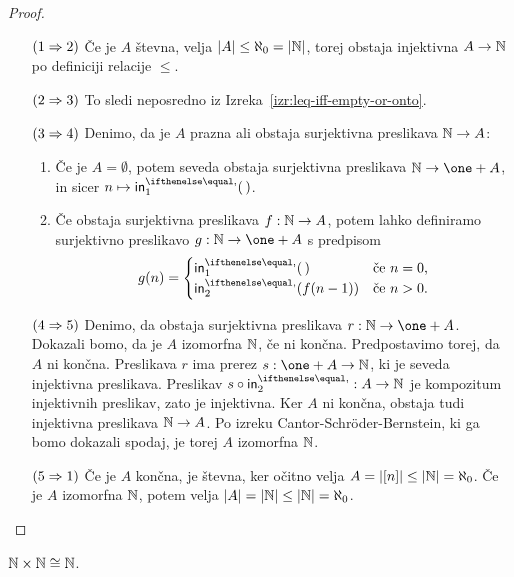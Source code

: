 \begin{proof}
%
\begin{itemize}
\item[$(1 \Rightarrow 2)$]
%
Če je $A$ števna, velja $|A| \leq \aleph_0 = |\mathbb{N}|$, torej obstaja injektivna $A \to
\mathbb{N}$ po definiciji relacije $\leq$.

\item[$(2 \Rightarrow 3)$]
%
To sledi neposredno iz Izreka~\ref{izr:leq-iff-empty-or-onto}.

\item[$(3 \Rightarrow 4)$]
%
Denimo, da je $A$ prazna ali obstaja surjektivna preslikava $\mathbb{N} \to A$:
%
\begin{enumerate}
\item
  Če je $A = \emptyset$, potem seveda obstaja surjektivna preslikava $\NN \to \one + A$, in sicer
  $n \mapsto \inl \unit$.
\item 
  Če obstaja surjektivna preslikava $f : \mathbb{N} \to A$, potem lahko definiramo surjektivno
  preslikavo $g : \NN \to \one + A$ s predpisom
  \begin{equation*}
    g(n) =
    \begin{cases}
      \inl \unit      &\text{če $n = 0$,}\\
      \inr (f(n-1))   &\text{če $n > 0$.}
    \end{cases}
  \end{equation*}
\end{enumerate}

\item[$(4 \Rightarrow 5)$]
%
Denimo, da obstaja surjektivna preslikava $r : \NN \to \one + A$.
Dokazali bomo, da je $A$ izomorfna $\mathbb{N}$, če ni končna.
Predpostavimo torej, da $A$ ni končna.
Preslikava $r$ ima prerez $s : \one + A \to \NN$, ki je seveda injektivna preslikava.
Preslikav $s \circ \inr : A \to \NN$ je kompozitum injektivnih preslikav, zato je injektivna.
Ker $A$ ni končna, obstaja tudi injektivna preslikava $\mathbb{N} \to A$.
Po izreku Cantor-Schröder-Bernstein, ki ga bomo dokazali spodaj, je torej $A$ izomorfna $\mathbb{N}$.

\item[$(5 \Rightarrow 1)$]
%
Če je $A$ končna, je števna, ker očitno velja $A = |[n]| \leq |\mathbb{N}| = \aleph_0$.
Če je $A$ izomorfna $\mathbb{N}$, potem velja $|A| = |\mathbb{N}| \leq |\mathbb{N}| = \aleph_0$.
\end{itemize}
\end{proof}

\begin{izrek}
  $\mathbb{N} \times \mathbb{N} \cong \mathbb{N}$.
\end{izrek}

